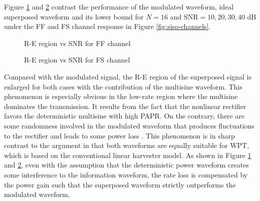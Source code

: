 Figure \ref{fig:siso-ff-snr} and \ref{fig:siso-fs-snr} contrast the performance of the modulated waveform, ideal superposed waveform and its lower bound for $N = 16$ and ${\text{SNR}} = 10,20,30,40$ dB under the FF and FS channel response in Figure \ref{fig:siso-channels}.

\begin{figure}[ht]
  \centering
  \quad
  \caption{R-E region vs SNR for FF channel}\label{fig:siso-ff-snr}
\end{figure}

\begin{figure}[ht]
  \centering
  \quad
  \caption{R-E region vs SNR for FS channel}\label{fig:siso-fs-snr}
\end{figure}

Compared with the modulated signal, the R-E region of the superposed signal is enlarged for both cases with the contribution of the multisine waveform. This phenomenon is especially obvious in the low-rate region where the multisine dominates the transmission. It results from the fact that the nonlinear rectifier favors the deterministic multisine with high PAPR. On the contrary, there are some randomness involved in the modulated waveform that produces fluctuations to the rectifier and leads to some power loss \cite{Clerckx2018}. This phenomenon is in sharp contrast to the argument in \cite{Xu2014a} that both waveforms are equally suitable for WPT, which is based on the conventional linear harvester model. As shown in Figure \ref{fig:siso-ff-snr} and \ref{fig:siso-fs-snr}, even with the assumption that the deterministic power waveform creates some interference to the information waveform, the rate loss is compensated by the power gain such that the superposed waveform strictly outperforms the modulated waveform.

